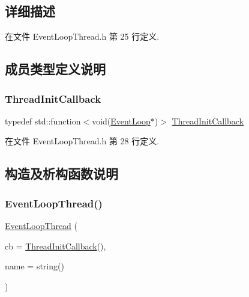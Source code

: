 \subsection{详细描述}


在文件 Event\+Loop\+Thread.\+h 第 25 行定义.



\subsection{成员类型定义说明}
\mbox{\label{classmuduo_1_1net_1_1EventLoopThread_a4665880f4633f1e7d95fd6fef6811717}} 
\subsubsection{\texorpdfstring{Thread\+Init\+Callback}{ThreadInitCallback}}
{\footnotesize\ttfamily typedef std\+::function$<$void(\hyperlink{classmuduo_1_1net_1_1EventLoop}{Event\+Loop}$\ast$)$>$ \hyperlink{classmuduo_1_1net_1_1EventLoopThread_a4665880f4633f1e7d95fd6fef6811717}{Thread\+Init\+Callback}}



在文件 Event\+Loop\+Thread.\+h 第 28 行定义.



\subsection{构造及析构函数说明}
\mbox{\label{classmuduo_1_1net_1_1EventLoopThread_a82bb7fe697802eff7fee149f57c648b9}} 
\subsubsection{\texorpdfstring{Event\+Loop\+Thread()}{EventLoopThread()}}
{\footnotesize\ttfamily \hyperlink{classmuduo_1_1net_1_1EventLoopThread}{Event\+Loop\+Thread} (\begin{DoxyParamCaption}\item[{const \hyperlink{classmuduo_1_1net_1_1EventLoopThread_a4665880f4633f1e7d95fd6fef6811717}{Thread\+Init\+Callback} \&}]{cb = {\ttfamily \hyperlink{classmuduo_1_1net_1_1EventLoopThread_a4665880f4633f1e7d95fd6fef6811717}{Thread\+Init\+Callback}()},  }\item[{const string \&}]{name = {\ttfamily string()} }\end{DoxyParamCaption})}

